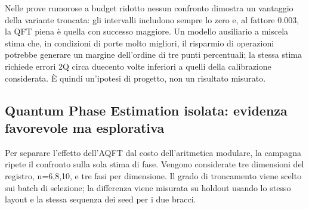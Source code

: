 Nelle prove rumorose a budget ridotto nessun confronto dimostra un vantaggio della variante troncata: gli intervalli includono sempre lo zero e, al fattore 0.003, la QFT piena è quella con successo maggiore. Un modello ausiliario a miscela stima che, in condizioni di porte molto migliori, il risparmio di operazioni potrebbe generare un margine dell'ordine di tre punti percentuali; la stessa stima richiede errori 2Q circa duecento volte inferiori a quelli della calibrazione considerata. È quindi un'ipotesi di progetto, non un risultato misurato.

\subsection{Quantum Phase Estimation isolata: evidenza favorevole ma esplorativa}\label{sec:finale_5_5_3}

Per separare l'effetto dell'AQFT dal costo dell'aritmetica modulare, la campagna ripete il confronto sulla sola stima di fase. Vengono considerate tre dimensioni del registro, n=6,8,10, e tre fasi per dimensione. Il grado di troncamento viene scelto sui batch di selezione; la differenza viene misurata su holdout usando lo stesso layout e la stessa sequenza dei seed per i due bracci.

